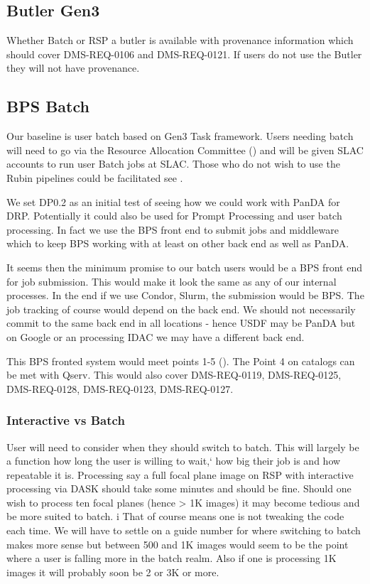 \subsection{Butler Gen3} \label{sec:gen3}

Whether Batch or RSP a butler is available with provenance information which should cover DMS-REQ-0106 and DMS-REQ-0121.
If users do not use the Butler they will not have provenance.

\subsection{BPS Batch }\label{sec:bpsbatch}

Our baseline is user batch based on Gen3 Task framework.
Users needing batch will need to go via the Resource Allocation Committee () and
will be given SLAC accounts to run user Batch jobs at SLAC.
Those who do not wish to use the Rubin pipelines could be facilitated see .


We set DP0.2 as an initial test of seeing how we could work with PanDA 
for DRP. Potentially it could also be used for Prompt Processing and user batch processing.
In fact we use the BPS front end to submit jobs and middleware which to keep BPS working with at least on other back end as well as PanDA.

It seems then the minimum promise to our batch users would be a BPS front end for job submission.
This would make it look the same as any of our internal processes.
In the end if we use Condor, Slurm, the submission would be BPS.
The job tracking of course would depend on the back end.
We should not necessarily commit to the same back end in all locations - hence USDF may be PanDA but on Google or an processing IDAC we may have a different back end.

This BPS fronted system would meet  points 1-5 (). The Point 4 on catalogs can be met with Qserv.
This would also cover DMS-REQ-0119, DMS-REQ-0125, DMS-REQ-0128, DMS-REQ-0123, DMS-REQ-0127.

\subsubsection{Interactive vs Batch} \label{sec:interactivevbatch}
User will need to consider when they should switch to batch.
This will largely be a function how long the user is willing to wait,` how big their job is and how repeatable it is.
Processing say a full focal plane image on RSP with interactive processing via DASK should take some minutes and should be fine.
Should one wish to process ten focal planes (hence > 1K images)  it may become tedious and be more suited to batch. i
That of course means  one is not tweaking the code each time.
We will have to settle on a guide number for where switching to batch makes more sense but between 500 and 1K images would
seem to be the point where a user is falling more in the batch realm.
Also if one is processing 1K images it will probably soon be 2 or 3K or more.




